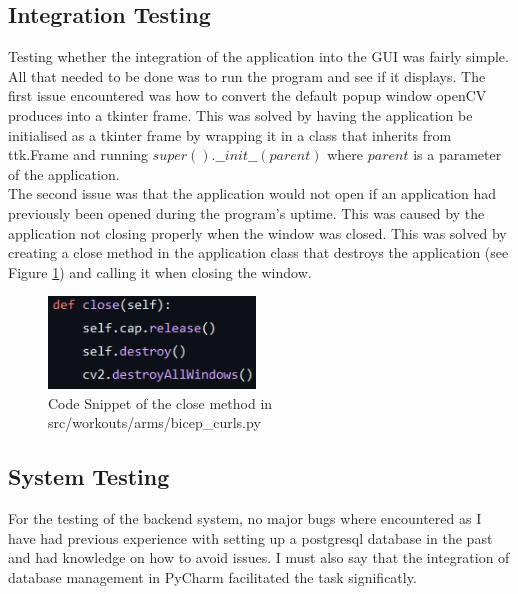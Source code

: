     \subsection{Integration Testing}
        Testing whether the integration of the application into the GUI was fairly simple. All that needed to be done was to run the program and see if it displays. The first issue encountered was how to convert the default popup window openCV produces into a tkinter frame. This was solved by having the application be initialised as a tkinter frame by wrapping it in a class that inherits from ttk.Frame and running $super().\_\_init\_\_(parent)$ where $parent$ is a parameter of the application.\\
        The second issue was that the application would not open if an application had previously been opened during the program's uptime. This was caused by the application not closing properly when the window was closed. This was solved by creating a close method in the application class that destroys the application (see Figure \ref{fig:close}) and calling it when closing the window.
        
        \begin{figure}[htbp]
                \centering
                \includegraphics[width=0.49\textwidth]{figures/close.png}
                \caption{Code Snippet of the close method in src/workouts/arms/bicep\_curls.py}
                \label{fig:close}
        \end{figure}

    \subsection{System Testing}
        For the testing of the backend system, no major bugs where encountered as I have had previous experience with setting up a postgresql database in the past and had knowledge on how to avoid issues. I must also say that the integration of database management in PyCharm facilitated the task significatly.